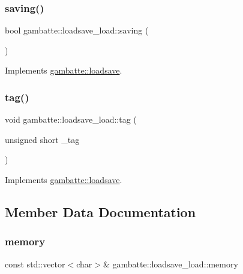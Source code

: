 \subsubsection{\texorpdfstring{saving()}{saving()}}
{\footnotesize\ttfamily bool gambatte\+::loadsave\+\_\+load\+::saving (\begin{DoxyParamCaption}{ }\end{DoxyParamCaption})\hspace{0.3cm}{\ttfamily [virtual]}}



Implements \hyperlink{classgambatte_1_1loadsave_a0a05b67eadfbb26f654f3d5ec287c652}{gambatte\+::loadsave}.

\mbox{\label{classgambatte_1_1loadsave__load_a85b86aaebae87da4bead8d3ed4ac3a9c}} 
\subsubsection{\texorpdfstring{tag()}{tag()}}
{\footnotesize\ttfamily void gambatte\+::loadsave\+\_\+load\+::tag (\begin{DoxyParamCaption}\item[{unsigned short}]{\+\_\+tag }\end{DoxyParamCaption})\hspace{0.3cm}{\ttfamily [virtual]}}



Implements \hyperlink{classgambatte_1_1loadsave_af4a635fc49c23e53e48b2b9d320aa165}{gambatte\+::loadsave}.



\subsection{Member Data Documentation}
\mbox{\label{classgambatte_1_1loadsave__load_aaf91faa9fd5d0ce6d4ff3d4e7749ce1d}} 
\subsubsection{\texorpdfstring{memory}{memory}}
{\footnotesize\ttfamily const std\+::vector$<$char$>$\& gambatte\+::loadsave\+\_\+load\+::memory\hspace{0.3cm}{\ttfamily [private]}}


